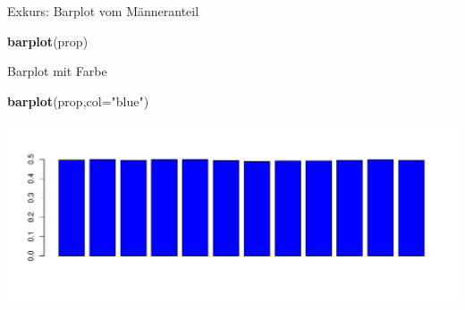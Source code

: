 \documentclass[ignorenonframetext,]{beamer}
\newenvironment{Shaded}{\begin{snugshade}}{\end{snugshade}}
\newcommand{\KeywordTok}[1]{\textcolor[rgb]{0.13,0.29,0.53}{\textbf{#1}}}
\newcommand{\DataTypeTok}[1]{\textcolor[rgb]{0.13,0.29,0.53}{#1}}
\newcommand{\StringTok}[1]{\textcolor[rgb]{0.31,0.60,0.02}{#1}}
\newcommand{\NormalTok}[1]{#1}
\begin{document}
\begin{frame}[fragile]{Exkurs: Barplot vom Männeranteil}

\begin{Shaded}
\begin{Highlighting}[]
\KeywordTok{barplot}\NormalTok{(prop)}
\end{Highlighting}
\end{Shaded}

\begin{block}{Barplot mit Farbe}

\begin{Shaded}
\begin{Highlighting}[]
\KeywordTok{barplot}\NormalTok{(prop,}\DataTypeTok{col=}\StringTok{"blue"}\NormalTok{)}
\end{Highlighting}
\end{Shaded}

\includegraphics{tmap_files/figure-beamer/unnamed-chunk-31-1.pdf}

\end{block}

\end{frame}
\end{document}
